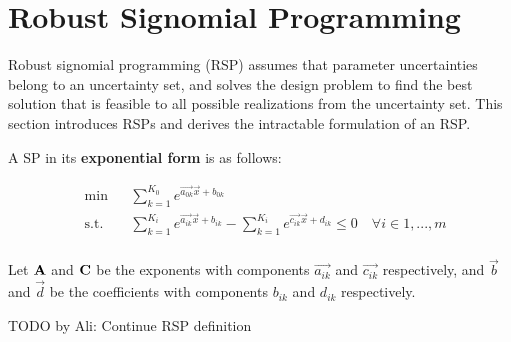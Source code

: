 \section{Robust Signomial Programming} \label{RSP}
Robust signomial programming (RSP) assumes that parameter uncertainties belong to an uncertainty set,
and solves the design problem to find the best solution that is
feasible to all possible realizations from the uncertainty set.
This section introduces RSPs and derives the intractable formulation of an RSP.

A SP in its \textbf{exponential form} is as follows:

\begin{equation}
\begin{aligned}
	& \min && \textstyle{\sum}_{k=1}^{K_0}e^{\vec{a_{0k}}\vec{x} + b_{0k}} \\
	& \text{s.t.} && \textstyle{\sum}_{k=1}^{K_i}e^{\vec{a_{ik}}\vec{x} + b_{ik}} - \textstyle{\sum}_{k=1}^{K_i}e^{\vec{c_{ik}}\vec{x} + d_{ik}} \leq 0 \quad \forall i \in 1,...,m\\
\end{aligned}
\label{SP_exponential}
\end{equation}

Let $\mathbf{A}$ and $\mathbf{C}$ be the exponents with components $\vec{a_{ik}}$ and $\vec{c_{ik}}$ respectively, and $\vec{b}$ and $\vec{d}$ be the coefficients with components $b_{ik}$ and $d_{ik}$ respectively.  

TODO by Ali: Continue RSP definition
